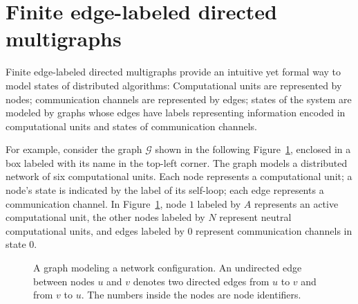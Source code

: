 \section{Finite edge-labeled directed multigraphs} 
Finite edge-labeled directed multigraphs provide an intuitive yet formal way to model states of distributed algorithms: Computational units are represented by nodes; communication channels are represented by edges; states of the system are modeled by graphs whose edges have labels representing information encoded in computational units and states of communication channels. 

For example, consider the graph $\mathcal{G}$ shown in the following Figure~\ref{fig:graph_modeling_state_network}, enclosed in a box labeled with its name in the top-left corner. 
The graph models a distributed network of six computational units.
Each node represents a computational unit; a node's state is indicated by the label of its self-loop; each edge represents a communication channel. In Figure~\ref{fig:graph_modeling_state_network}, node $1$ labeled by $A$ represents an active computational unit, the other nodes labeled by $N$ represent neutral computational units, and edges labeled by $0$ represent communication channels in state $0$. 
\begin{figure}[H]
        \centering
    \caption{A graph modeling a network configuration. An undirected edge between nodes $u$ and $v$ denotes two directed edges from $u$ to $v$ and from $v$ to $u$. The numbers inside the nodes are node identifiers.}
    \label{fig:graph_modeling_state_network}
\end{figure}

